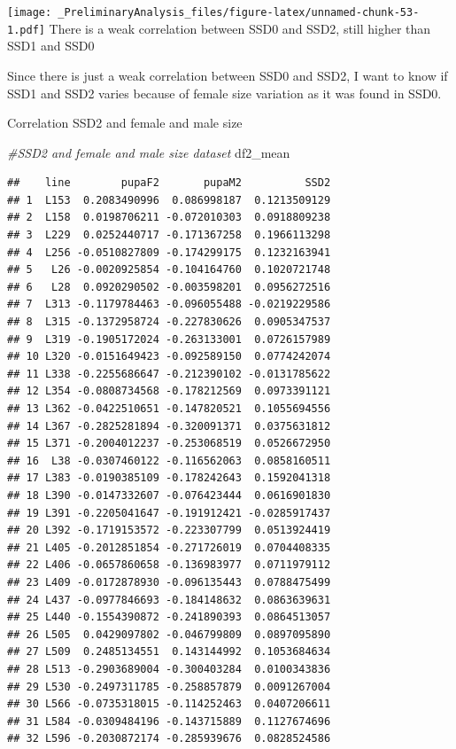 \documentclass[
]{article}
\newenvironment{Shaded}{\begin{snugshade}}{\end{snugshade}}
\newcommand{\CommentTok}[1]{\textcolor[rgb]{0.56,0.35,0.01}{\textit{#1}}}
\newcommand{\NormalTok}[1]{#1}
\begin{document}
\texttt{[image: \_PreliminaryAnalysis\_files/figure-latex/unnamed-chunk-53-1.pdf]}
There is a weak correlation between SSD0 and SSD2, still higher than
SSD1 and SSD0

Since there is just a weak correlation between SSD0 and SSD2, I want to
know if SSD1 and SSD2 varies because of female size variation as it was
found in SSD0.

Correlation SSD2 and female and male size

\begin{Shaded}
\begin{Highlighting}[]
\CommentTok{#SSD2 and female and male size dataset}
\NormalTok{df2_mean}
\end{Highlighting}
\end{Shaded}

\begin{verbatim}
##    line        pupaF2       pupaM2          SSD2
## 1  L153  0.2083490996  0.086998187  0.1213509129
## 2  L158  0.0198706211 -0.072010303  0.0918809238
## 3  L229  0.0252440717 -0.171367258  0.1966113298
## 4  L256 -0.0510827809 -0.174299175  0.1232163941
## 5   L26 -0.0020925854 -0.104164760  0.1020721748
## 6   L28  0.0920290502 -0.003598201  0.0956272516
## 7  L313 -0.1179784463 -0.096055488 -0.0219229586
## 8  L315 -0.1372958724 -0.227830626  0.0905347537
## 9  L319 -0.1905172024 -0.263133001  0.0726157989
## 10 L320 -0.0151649423 -0.092589150  0.0774242074
## 11 L338 -0.2255686647 -0.212390102 -0.0131785622
## 12 L354 -0.0808734568 -0.178212569  0.0973391121
## 13 L362 -0.0422510651 -0.147820521  0.1055694556
## 14 L367 -0.2825281894 -0.320091371  0.0375631812
## 15 L371 -0.2004012237 -0.253068519  0.0526672950
## 16  L38 -0.0307460122 -0.116562063  0.0858160511
## 17 L383 -0.0190385109 -0.178242643  0.1592041318
## 18 L390 -0.0147332607 -0.076423444  0.0616901830
## 19 L391 -0.2205041647 -0.191912421 -0.0285917437
## 20 L392 -0.1719153572 -0.223307799  0.0513924419
## 21 L405 -0.2012851854 -0.271726019  0.0704408335
## 22 L406 -0.0657860658 -0.136983977  0.0711979112
## 23 L409 -0.0172878930 -0.096135443  0.0788475499
## 24 L437 -0.0977846693 -0.184148632  0.0863639631
## 25 L440 -0.1554390872 -0.241890393  0.0864513057
## 26 L505  0.0429097802 -0.046799809  0.0897095890
## 27 L509  0.2485134551  0.143144992  0.1053684634
## 28 L513 -0.2903689004 -0.300403284  0.0100343836
## 29 L530 -0.2497311785 -0.258857879  0.0091267004
## 30 L566 -0.0735318015 -0.114252463  0.0407206611
## 31 L584 -0.0309484196 -0.143715889  0.1127674696
## 32 L596 -0.2030872174 -0.285939676  0.0828524586

\end{verbatim}
\end{document}
